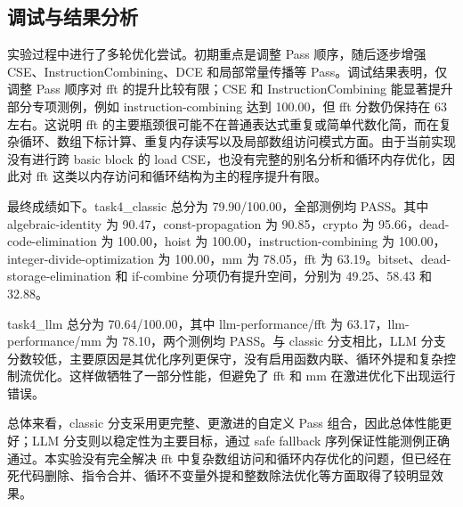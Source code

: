 \subsection{调试与结果分析}

实验过程中进行了多轮优化尝试。初期重点是调整 Pass 顺序，随后逐步增强 CSE、InstructionCombining、DCE 和局部常量传播等 Pass。调试结果表明，仅调整 Pass 顺序对 fft 的提升比较有限；CSE 和 InstructionCombining 能显著提升部分专项测例，例如 instruction-combining 达到 100.00，但 fft 分数仍保持在 63 左右。这说明 fft 的主要瓶颈很可能不在普通表达式重复或简单代数化简，而在复杂循环、数组下标计算、重复内存读写以及局部数组访问模式方面。由于当前实现没有进行跨 basic block 的 load CSE，也没有完整的别名分析和循环内存优化，因此对 fft 这类以内存访问和循环结构为主的程序提升有限。

最终成绩如下。task4\_classic 总分为 79.90/100.00，全部测例均 PASS。其中 algebraic-identity 为 90.47，const-propagation 为 90.85，crypto 为 95.66，dead-code-elimination 为 100.00，hoist 为 100.00，instruction-combining 为 100.00，integer-divide-optimization 为 100.00，mm 为 78.05，fft 为 63.19。bitset、dead-storage-elimination 和 if-combine 分项仍有提升空间，分别为 49.25、58.43 和 32.88。

task4\_llm 总分为 70.64/100.00，其中 llm-performance/fft 为 63.17，llm-performance/mm 为 78.10，两个测例均 PASS。与 classic 分支相比，LLM 分支分数较低，主要原因是其优化序列更保守，没有启用函数内联、循环外提和复杂控制流优化。这样做牺牲了一部分性能，但避免了 fft 和 mm 在激进优化下出现运行错误。

总体来看，classic 分支采用更完整、更激进的自定义 Pass 组合，因此总体性能更好；LLM 分支则以稳定性为主要目标，通过 safe fallback 序列保证性能测例正确通过。本实验没有完全解决 fft 中复杂数组访问和循环内存优化的问题，但已经在死代码删除、指令合并、循环不变量外提和整数除法优化等方面取得了较明显效果。

